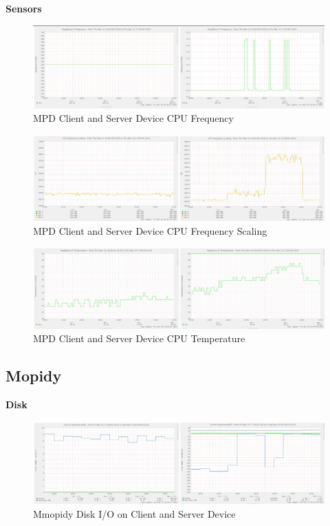 \documentclass[11pt,a4paper,headinclude=false,footinclude=false]{scrreprt}
\begin{document}
\textbf{Sensors}

\begin{figure}[H]
\includegraphics{ResultsAndAnalysis/MPDServerTestImages/001MPDCPUFreq.png}
\centering
\caption{MPD Client and Server Device CPU Frequency}
\label{MPDCPUFreq}
\end{figure}

\begin{figure}[H]
\includegraphics{ResultsAndAnalysis/MPDServerTestImages/002MPDCPUFreqScaling.png}
\centering
\caption{MPD Client and Server Device CPU Frequency Scaling}
\label{MPDCPUFreqScaling}
\end{figure}

\begin{figure}[H]
\includegraphics{ResultsAndAnalysis/MPDServerTestImages/003MPDCPUTemp.png}
\centering
\caption{MPD Client and Server Device CPU Temperature}
\label{MPDCPUTemp}
\end{figure}

\subsection{Mopidy}\label{mopidy-2}

\textbf{Disk}

\begin{figure}[H]
\includegraphics{ResultsAndAnalysis/MopidyServerTestImages/005MopidyDiskIO.png}
\centering
\caption{Mmopidy Disk I/O on Client and Server Device}
\label{MopidyDiskIO}
\end{figure}
\end{document}
